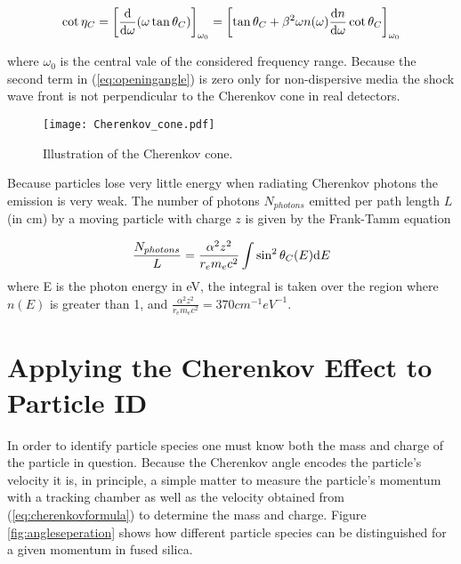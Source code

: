 \begin{equation}
	\cot\eta_C = \left[\frac{\mathrm{d}}{\mathrm{d}\omega}(\omega \tan\theta_{C}) \right]_{\omega_0} = \left[\tan\theta_{C} + \beta^2\omega n(\omega) \frac{\mathrm{d} n}{\mathrm{d}\omega}\cot\theta_{C} \right]_{\omega_0}
	\label{eq:openingangle}
\end{equation}

where $\omega_0$ is the central vale of the considered frequency range. Because the second term in (\ref{eq:openingangle}) is zero only for non-dispersive media the shock wave front is not perpendicular to the Cherenkov cone in real detectors.

\begin{figure}[ht]
	\centering
	\texttt{[image: Cherenkov\_cone.pdf]}
	\caption{Illustration of the Cherenkov cone.}
	\label{fig:cherenkovcone}
\end{figure}

Because particles lose very little energy when radiating Cherenkov photons the emission is very weak. The number of photons $N_{photons}$ emitted per path length $L$ (in cm) by a moving particle with charge $z$ is given by the Frank-Tamm equation

\begin{equation}
	\frac{N_{photons}}{L} = \frac{\alpha^2 z^2}{r_e m_e c^2} \int \sin^2\theta_{C} (E) \mathrm{d} E
	\label{eq:nphotons}
\end{equation}
where E is the photon energy in eV, the integral is taken over the region where $n(E)$ is greater than 1, and $\frac{\alpha^2 z^2}{r_e m_e c^2} = 370\unit{cm}^{-1}\unit{eV}^{-1}$.

\section{Applying the Cherenkov Effect to Particle ID}
In order to identify particle species one must know both the mass and charge of the particle in question. Because the Cherenkov angle encodes the particle's velocity it is, in principle, a simple matter to measure the particle's momentum with a tracking chamber as well as the velocity obtained from (\ref{eq:cherenkovformula}) to determine the mass and charge. Figure \ref{fig:angleseperation} shows how different particle species can be distinguished for a given momentum in fused silica.

